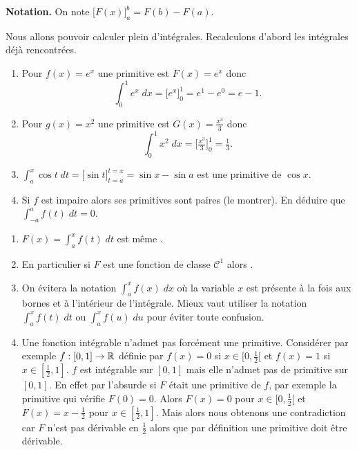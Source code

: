 \documentclass[class=report,crop=false]{standalone}
\begin{document}
\textbf{Notation.} On note $\big[F(x)\big]_a^b=F(b)-F(a)$.


\begin{exemple}
Nous allons pouvoir calculer plein d'intégrales. Recalculons d'abord
les intégrales déjà rencontrées.
\begin{enumerate}
  \item  Pour $f(x)=e^x$ une primitive est $F(x)=e^x$ donc
$$\int_0^1 e^x \; dx =  \big[e^x\big]_0^1=e^1-e^0=e-1.$$

  \item Pour $g(x)=x^2$ une primitive est $G(x)=\frac{x^3}{3}$ donc
$$\int_0^1 x^2 \; dx =  \big[\tfrac{x^3}{3}\big]_0^1=\tfrac{1}{3}.$$

  \item $\int_a^x \cos t \; dt = \big[ \sin t\big]_{t=a}^{t=x} = \sin x - \sin a$
est une primitive de $\cos x$.

  \item Si $f$ est impaire alors ses primitives sont paires (le montrer).
  En déduire que $\int_{-a}^a f(t)  \; dt = 0$.
\end{enumerate}
\end{exemple}


\begin{remarque*}
\sauteligne
\begin{enumerate}

  \item $F(x)=\int_a^x f(t) \; dt$ est même .

  \item En particulier si $F$ est une fonction de classe $\mathcal{C}^1$ alors
.

  \item On évitera la notation $\int_a^x f(x) \; dx$ où la variable $x$ est présente à la fois aux bornes et à l'intérieur de l'intégrale. Mieux vaut utiliser la
  notation $\int_a^x f(t) \; dt$ ou $\int_a^x f(u) \;du$ pour éviter toute
  confusion.

  \item Une fonction intégrable n'admet pas forcément une primitive.
Considérer par exemple $f : [0,1] \to \mathbb{R}$ définie par $f(x)=0$
si $x \in [0,\frac{1}{2}[$ et $f(x)=1$ si $x \in [\frac{1}{2},1]$.
$f$ est intégrable sur $[0,1]$ mais elle n'admet pas de primitive sur $[0,1]$.
En effet par l'absurde si $F$ était une primitive de $f$, par exemple la primitive qui vérifie $F(0)=0$.
Alors $F(x)=0$ pour $x\in[0,\frac12[$ et $F(x)= x -\frac{1}{2}$ pour $x\in [\frac{1}{2},1]$.
Mais alors nous obtenons une contradiction car $F$ n'est pas dérivable en $\frac12$ alors que
par définition une primitive doit être dérivable.
\end{enumerate}
\end{remarque*}
\end{document}
